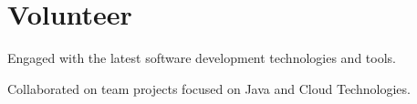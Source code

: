 \section{Volunteer}
  \begin{vitemize}
    \item Engaged with the latest software development technologies and tools.
    \item Collaborated on team projects focused on Java and Cloud Technologies.
  \end{vitemize}
\sectionsep